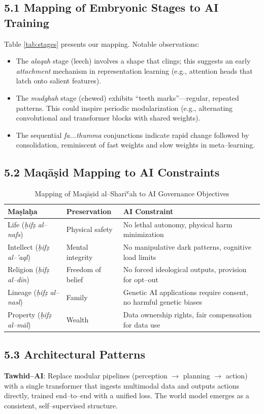 \documentclass[12pt,twocolumn]{article}
\begin{document}
\subsection*{5.1 Mapping of Embryonic Stages to AI Training}
Table \ref{tab:stages} presents our mapping. Notable observations:
\begin{itemize}[leftmargin=*]
\item The \emph{alaqah} stage (leech) involves a shape that clings; this suggests an early \emph{attachment} mechanism in representation learning (e.g., attention heads that latch onto salient features).
\item The \emph{mudghah} stage (chewed) exhibits ``teeth marks''—regular, repeated patterns. This could inspire periodic modularization (e.g., alternating convolutional and transformer blocks with shared weights).
\item The sequential \emph{fa...thumma} conjunctions indicate rapid change followed by consolidation, reminiscent of fast weights and slow weights in meta--learning.
\end{itemize}

\subsection*{5.2 Maqāṣid Mapping to AI Constraints}
\begin{table}[h]
\centering
\caption{Mapping of Maqāṣid al--Sharīʿah to AI Governance Objectives}
\label{tab:maqasid}
\begin{tabular}{@{}lll@{}}
\toprule
Maṣlaḥa & Preservation & AI Constraint \\
\midrule
Life (\emph{ḥifẓ al--nafs}) & Physical safety & No lethal autonomy, physical harm minimization \\
Intellect (\emph{ḥifẓ al--'aql}) & Mental integrity & No manipulative dark patterns, cognitive load limits \\
Religion (\emph{ḥifẓ al--dīn}) & Freedom of belief & No forced ideological outputs, provision for opt--out \\
Lineage (\emph{ḥifẓ al--nasl}) & Family & Genetic AI applications require consent, no harmful genetic biases \\
Property (\emph{ḥifẓ al--māl}) & Wealth & Data ownership rights, fair compensation for data use \\
\bottomrule
\end{tabular}
\end{table}

\subsection*{5.3 Architectural Patterns}
\textbf{Tawhid--AI}: Replace modular pipelines (perception $\to$ planning $\to$ action) with a single transformer that ingests multimodal data and outputs actions directly, trained end--to--end with a unified loss. The world model emerges as a consistent, self--supervised structure.
\end{document}
